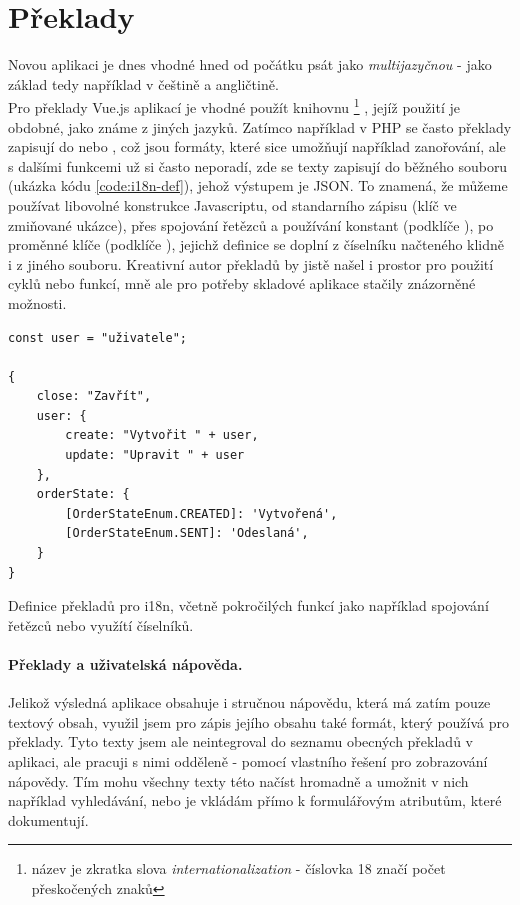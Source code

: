 
\section{Překlady}

Novou aplikaci je dnes vhodné hned od počátku psát jako \emph{multijazyčnou} - jako základ tedy například v češtině a angličtině.\\
Pro překlady Vue.js aplikací je vhodné použít knihovnu \footnote{název je zkratka slova \emph{internationalization} - číslovka 18 značí počet přeskočených znaků} \cite{vue-i18n}, jejíž použití je obdobné, jako známe z jiných jazyků. Zatímco například v PHP se často překlady zapisují do  nebo , což jsou formáty, které sice umožňují například zanořování, ale s dalšími funkcemi už si často neporadí, zde se texty zapisují do běžného  souboru (ukázka kódu \ref{code:i18n-def}), jehož výstupem je JSON. To znamená, že můžeme používat libovolné konstrukce Javascriptu, od standarního zápisu (klíč  ve zmiňované ukázce), přes spojování řetězců a používání konstant (podklíče ), po proměnné klíče (podklíče ), jejichž definice se doplní z číselníku načteného klidně i z jiného souboru. Kreativní autor překladů by jistě našel i prostor pro použití cyklů nebo funkcí, mně ale pro potřeby skladové aplikace stačily znázorněné možnosti.

\begin{listing}[h]
\begin{verbatim}
const user = "uživatele";

{
    close: "Zavřít",
    user: {
        create: "Vytvořit " + user,
        update: "Upravit " + user
    },
    orderState: {
        [OrderStateEnum.CREATED]: 'Vytvořená',
        [OrderStateEnum.SENT]: 'Odeslaná',
    }
}
\end{verbatim}
\caption[Definice překladů pro i18n]{Definice překladů pro i18n, včetně pokročilých funkcí jako například spojování řetězců nebo využítí číselníků.} \label{code:i18n-def}
\end{listing}

\paragraph{Překlady a uživatelská nápověda.} Jelikož výsledná aplikace obsahuje i stručnou nápovědu, která má zatím pouze textový obsah, využil jsem pro zápis jejího obsahu také formát, který používá  pro překlady. Tyto texty jsem ale neintegroval do seznamu obecných překladů v aplikaci, ale pracuji s nimi odděleně - pomocí vlastního řešení pro zobrazování nápovědy. Tím mohu všechny texty této  načíst hromadně a umožnit v nich například vyhledávání, nebo je vkládám přímo k formulářovým atributům, které dokumentují.

